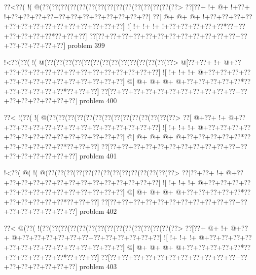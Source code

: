 \vbox{\vbox{\goo
\0??<\0??(\- !(\- @(\0??(\0??(\0??(\0??(\0??(\0??(\0??(\0??(\0??(\0??(\0??(\0??(\0??(\0??(\0??>
\0??[\0??+\- !+\- @+\- !+\0??+\- !+\0??+\0??+\0??+\0??+\0??+\0??+\0??+\0??+\0??+\0??+\0??+\0??]
\0??[\- @+\- @+\- @+\- !+\0??+\0??+\0??+\0??+\0??+\0??+\0??+\0??+\0??+\0??+\0??+\0??+\0??+\0??]
\- ![\- !+\- !+\- !+\- !+\0??+\0??+\0??+\0??+\0??*\0??+\0??+\0??+\0??+\0??+\0??*\0??+\0??+\0??]
\0??[\0??+\0??+\0??+\0??+\0??+\0??+\0??+\0??+\0??+\0??+\0??+\0??+\0??+\0??+\0??+\0??+\0??+\0??]
}
\hfil problem 399\hfil\break
}



\vbox{\vbox{\goo
\- !<\0??(\0??(\- !(\- @(\0??(\0??(\0??(\0??(\0??(\0??(\0??(\0??(\0??(\0??(\0??(\0??(\0??(\0??>
\- @[\0??+\0??+\- !+\- @+\0??+\0??+\0??+\0??+\0??+\0??+\0??+\0??+\0??+\0??+\0??+\0??+\0??+\0??]
\- ![\- !+\- !+\- !+\- @+\0??+\0??+\0??+\0??+\0??+\0??+\0??+\0??+\0??+\0??+\0??+\0??+\0??+\0??]
\- @[\- @+\- @+\- @+\- @+\0??+\0??+\0??+\0??+\0??*\0??+\0??+\0??+\0??+\0??+\0??*\0??+\0??+\0??]
\0??[\0??+\0??+\0??+\0??+\0??+\0??+\0??+\0??+\0??+\0??+\0??+\0??+\0??+\0??+\0??+\0??+\0??+\0??]
}
\hfil problem 400\hfil\break
}



\vbox{\vbox{\goo
\0??<\- !(\0??(\- !(\- @(\0??(\0??(\0??(\0??(\0??(\0??(\0??(\0??(\0??(\0??(\0??(\0??(\0??(\0??>
\0??[\- @+\0??+\- !+\- @+\0??+\0??+\0??+\0??+\0??+\0??+\0??+\0??+\0??+\0??+\0??+\0??+\0??+\0??]
\- ![\- !+\- !+\- !+\- @+\0??+\0??+\0??+\0??+\0??+\0??+\0??+\0??+\0??+\0??+\0??+\0??+\0??+\0??]
\- @[\- @+\- @+\- @+\- @+\0??+\0??+\0??+\0??+\0??*\0??+\0??+\0??+\0??+\0??+\0??*\0??+\0??+\0??]
\0??[\0??+\0??+\0??+\0??+\0??+\0??+\0??+\0??+\0??+\0??+\0??+\0??+\0??+\0??+\0??+\0??+\0??+\0??]
}
\hfil problem 401\hfil\break
}



\vbox{\vbox{\goo
\- !<\0??(\- @(\- !(\- @(\0??(\0??(\0??(\0??(\0??(\0??(\0??(\0??(\0??(\0??(\0??(\0??(\0??(\0??>
\0??[\0??+\0??+\- !+\- @+\0??+\0??+\0??+\0??+\0??+\0??+\0??+\0??+\0??+\0??+\0??+\0??+\0??+\0??]
\- ![\- !+\- !+\- !+\- @+\0??+\0??+\0??+\0??+\0??+\0??+\0??+\0??+\0??+\0??+\0??+\0??+\0??+\0??]
\- @[\- @+\- @+\- @+\- @+\0??+\0??+\0??+\0??+\0??*\0??+\0??+\0??+\0??+\0??+\0??*\0??+\0??+\0??]
\0??[\0??+\0??+\0??+\0??+\0??+\0??+\0??+\0??+\0??+\0??+\0??+\0??+\0??+\0??+\0??+\0??+\0??+\0??]
}
\hfil problem 402\hfil\break
}



\vbox{\vbox{\goo
\0??<\- @(\0??(\- !(\0??(\0??(\0??(\0??(\0??(\0??(\0??(\0??(\0??(\0??(\0??(\0??(\0??(\0??(\0??>
\0??[\0??+\- @+\- !+\- @+\0??+\- @+\0??+\0??+\0??+\0??+\0??+\0??+\0??+\0??+\0??+\0??+\0??+\0??]
\- ![\- !+\- !+\- !+\- @+\0??+\0??+\0??+\0??+\0??+\0??+\0??+\0??+\0??+\0??+\0??+\0??+\0??+\0??]
\- @[\- @+\- @+\- @+\- @+\0??+\0??+\0??+\0??+\0??*\0??+\0??+\0??+\0??+\0??+\0??*\0??+\0??+\0??]
\0??[\0??+\0??+\0??+\0??+\0??+\0??+\0??+\0??+\0??+\0??+\0??+\0??+\0??+\0??+\0??+\0??+\0??+\0??]
}
\hfil problem 403\hfil\break
}




